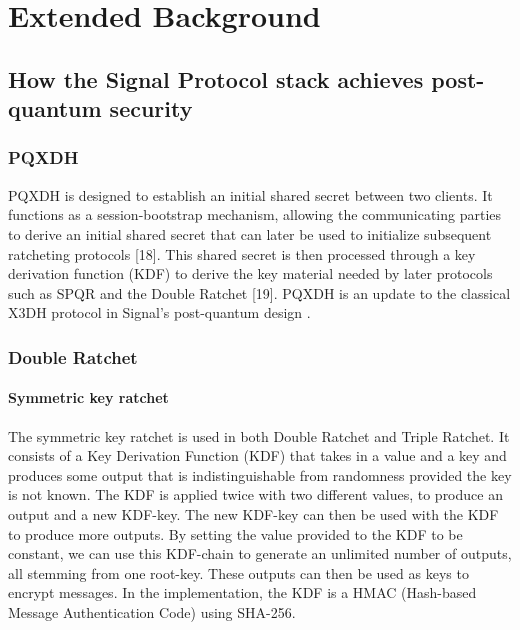 \chapter{Extended Background}

\section{How the Signal Protocol stack achieves post-quantum security}

\subsection{PQXDH}

PQXDH is designed to establish an initial shared secret between two clients. It functions as a session-bootstrap mechanism, allowing the communicating parties to derive an initial shared secret that can later be used to initialize subsequent ratcheting protocols [18]. This shared secret is then processed through a key derivation function (KDF) to derive the key material needed by later protocols such as SPQR and the Double Ratchet [19]. PQXDH is an update to the classical X3DH protocol in Signal’s post-quantum design \cite{ref16}. 

\subsection{Double Ratchet}

\subsubsection{Symmetric key ratchet}

The symmetric key ratchet is used in both Double Ratchet and Triple Ratchet.
It consists of a Key Derivation Function (KDF) that takes in a value and a key and produces some output that is indistinguishable from randomness provided the key is not known.
The KDF is applied twice with two different values, to produce an output and a new KDF-key.
The new KDF-key can then be used with the KDF to produce more outputs.
By setting the value provided to the KDF to be constant, we can use this KDF-chain to generate an unlimited number of outputs, all stemming from one root-key.
These outputs can then be used as keys to encrypt messages.
In the implementation, the KDF is a HMAC (Hash-based Message Authentication Code) using SHA-256. \cite{ref19}

 

